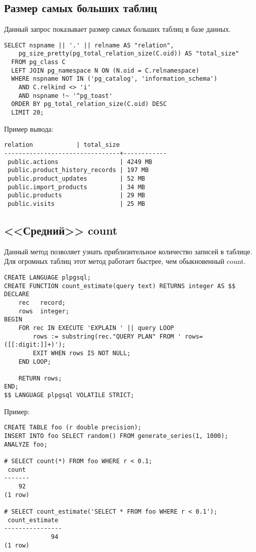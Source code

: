 \subsection{Размер самых больших таблиц}
Данный запрос показывает размер самых больших таблиц в базе данных.

\begin{lstlisting}[label=lst:snippets3,title=snippets/biggest\_tables.sql]
SELECT nspname || '.' || relname AS "relation",
    pg_size_pretty(pg_total_relation_size(C.oid)) AS "total_size"
  FROM pg_class C
  LEFT JOIN pg_namespace N ON (N.oid = C.relnamespace)
  WHERE nspname NOT IN ('pg_catalog', 'information_schema')
    AND C.relkind <> 'i'
    AND nspname !~ '^pg_toast'
  ORDER BY pg_total_relation_size(C.oid) DESC
  LIMIT 20;
\end{lstlisting}

Пример вывода:
\begin{lstlisting}[label=lst:snippets4,caption=Размер самых больших таблиц. Пример вывода]
            relation            | total_size 
--------------------------------+------------
 public.actions                 | 4249 MB
 public.product_history_records | 197 MB
 public.product_updates         | 52 MB
 public.import_products         | 34 MB
 public.products                | 29 MB
 public.visits                  | 25 MB
\end{lstlisting}

\subsection{<<Средний>> count}
Данный метод позволяет узнать приблизительное количество записей в таблице. 
Для огромных таблиц этот метод работает быстрее, чем обыкновенный count.

\begin{lstlisting}[label=lst:snippets5,title=snippets/count\_estimate.sql]
CREATE LANGUAGE plpgsql;
CREATE FUNCTION count_estimate(query text) RETURNS integer AS $$
DECLARE
    rec   record;
    rows  integer;
BEGIN
    FOR rec IN EXECUTE 'EXPLAIN ' || query LOOP
        rows := substring(rec."QUERY PLAN" FROM ' rows=([[:digit:]]+)');
        EXIT WHEN rows IS NOT NULL;
    END LOOP;
 
    RETURN rows;
END;
$$ LANGUAGE plpgsql VOLATILE STRICT;
\end{lstlisting}

Пример:
\begin{lstlisting}[label=lst:snippets51,caption=<<Средний>> count. Пример]
CREATE TABLE foo (r double precision);
INSERT INTO foo SELECT random() FROM generate_series(1, 1000);
ANALYZE foo;

# SELECT count(*) FROM foo WHERE r < 0.1;
 count 
-------
    92
(1 row)

# SELECT count_estimate('SELECT * FROM foo WHERE r < 0.1');
 count_estimate 
----------------
             94
(1 row)
\end{lstlisting}

